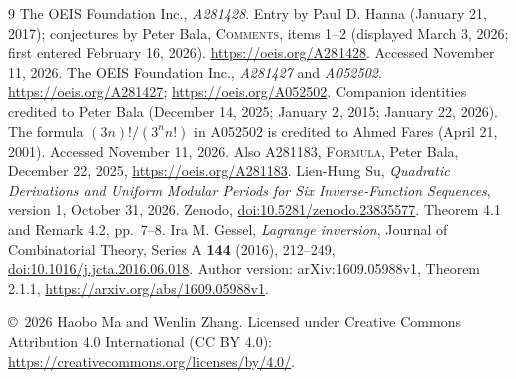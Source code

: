 \documentclass[11pt]{article}
\begin{document}
\begin{thebibliography}{9}
The OEIS Foundation Inc., \emph{A281428}.
Entry by Paul D. Hanna (January 21, 2017);
conjectures by Peter Bala, \textsc{Comments}, items 1--2
(displayed March 3, 2026; first entered February 16, 2026).
\url{https://oeis.org/A281428}. Accessed November 11, 2026.
The OEIS Foundation Inc., \emph{A281427} and \emph{A052502}.
\url{https://oeis.org/A281427}; \url{https://oeis.org/A052502}.
Companion identities credited to Peter Bala (December 14, 2025;
January 2, 2015; January 22, 2026).
The formula $(3n)!/(3^n n!)$ in A052502 is credited to Ahmed Fares
(April 21, 2001). Accessed November 11, 2026.
Also A281183, \textsc{Formula}, Peter Bala, December 22, 2025,
\url{https://oeis.org/A281183}.
Lien-Hung Su, \emph{Quadratic Derivations and Uniform Modular Periods
for Six Inverse-Function Sequences}, version 1, October 31, 2026.
Zenodo, \href{https://doi.org/10.5281/zenodo.23835577}{doi:10.5281/zenodo.23835577}.
Theorem 4.1 and Remark 4.2, pp.~7--8.
Ira M. Gessel, \emph{Lagrange inversion}, Journal of Combinatorial Theory,
Series A \textbf{144} (2016), 212--249,
\href{https://doi.org/10.1016/j.jcta.2016.06.018}{doi:10.1016/j.jcta.2016.06.018}.
Author version: arXiv:1609.05988v1, Theorem 2.1.1,
\url{https://arxiv.org/abs/1609.05988v1}.
\end{thebibliography}
\bigskip\noindent\small
\copyright\ 2026 Haobo Ma and Wenlin Zhang.
Licensed under Creative Commons Attribution 4.0 International
(CC BY 4.0): \url{https://creativecommons.org/licenses/by/4.0/}.
\end{document}

